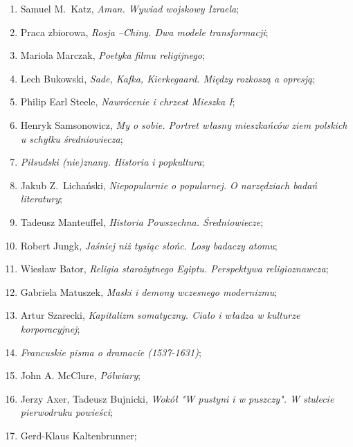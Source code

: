 \documentclass[a4paper,11pt]{article}
\begin{document}
\begin{enumerate}
\item Samuel M.~Katz, \emph{Aman. Wywiad wojskowy Izraela};

\item Praca zbiorowa, \emph{Rosja --Chiny. Dwa modele transformacji};

\item Mariola Marczak, \emph{Poetyka filmu religijnego};

\item Lech Bukowski, \emph{Sade, Kafka, Kierkegaard. Między rozkoszą a
    opresją};

\item Philip Earl Steele, \emph{Nawrócenie i chrzest Mieszka I};

\item Henryk Samsonowicz, \emph{My o sobie. Portret własny mieszkańców
    ziem polskich u schyłku średniowiecza};

\item \emph{Piłsudski (nie)znany. Historia i popkultura};

\item Jakub Z.~Lichański, \emph{Niepopularnie o popularnej. O
    narzędziach badań literatury};

\item Tadeusz Manteuffel, \emph{Historia Powszechna. Średniowiecze};

\item Robert Jungk, \emph{Jaśniej niż tysiąc słońc. Losy badaczy
    atomu};

\item Wiesław Bator, \emph{Religia starożytnego Egiptu. Perspektywa
    religioznawcza};

\item Gabriela Matuszek, \emph{Maski i demony wczesnego modernizmu};

\item Artur Szarecki, \emph{Kapitalizm somatyczny. Ciało i władza w
    kulturze korporacyjnej};

\item \emph{Francuskie pisma o dramacie (1537-1631)};

\item John A. McClure, \emph{Półwiary};

\item Jerzy Axer, Tadeusz Bujnicki, \emph{Wokół "W pustyni i w
    puszczy". W stulecie pierwodruku powieści};

\item Gerd-Klaus Kaltenbrunner;


\end{enumerate}
\end{document}
